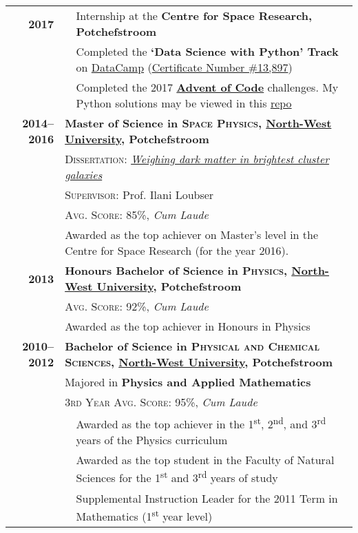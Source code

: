 \documentclass[a4paper,10pt]{article}
\begin{document}
\begin{tabularx}{\textwidth}{r l X}
	\textbf{2017} & \textbullet &
	Internship at the \textbf{Centre for Space Research, Potchefstroom} \\
	& \textbullet & Completed the \textbf{`Data Science with Python' Track} on \href{https://www.datacamp.com/}{DataCamp} (\href{https://www.datacamp.com/Certificate\#13,897}{Certificate Number \#13,897}) \\
	& \textbullet & Completed the 2017 \textbf{\href{https://adventofcode.com/}{Advent of Code}} challenges. My Python solutions may be viewed in this \href{https://github.com/HenriBranken/Advent_of_Code_2017_python_3}{repo} \\\hline
	
	\textbf{2014--2016} & \multicolumn{2}{X}{\textbf{Master of Science in \textsc{Space Physics}, \href{https://www.nwu.ac.za/}{North-West University}, Potchefstroom}}\\
	& \multicolumn{2}{X}{\textsc{Dissertation:} \href{https://repository.nwu.ac.za/handle/10394/25063}{\textit{Weighing dark matter in brightest cluster galaxies}}}\\
	& \multicolumn{2}{X}{\textsc{Supervisor:} Prof. Ilani Loubser} \\
	& \multicolumn{2}{X}{\textsc{Avg. Score:} 85\%, \textit{Cum Laude}} \\
	& \multicolumn{2}{X}{Awarded as the top achiever on Master’s level in the Centre for Space Research (for the year 2016).} \\\hline

	\textbf{2013} & \multicolumn{2}{X}{\textbf{Honours Bachelor of Science in \textsc{Physics}, \href{https://www.nwu.ac.za/}{North-West University}, Potchefstroom}}\\
	& \multicolumn{2}{X}{\textsc{Avg. Score:} 92\%, \textit{Cum Laude}}\\
	& \multicolumn{2}{X}{Awarded as the top achiever in Honours in Physics}\\\hline

	\textbf{2010--2012} & \multicolumn{2}{X}{\textbf{Bachelor of Science in \textsc{Physical and Chemical Sciences}, \href{https://www.nwu.ac.za/}{North-West University}, Potchefstroom}} \\
 	& \multicolumn{2}{X}{Majored in \textbf{Physics and Applied Mathematics}} \\
 	& \multicolumn{2}{X}{\textsc{3rd Year Avg. Score:} 95\%, \textit{Cum Laude}} \\
 	& \textbullet & Awarded as the top achiever in the 1\textsuperscript{st}, 2\textsuperscript{nd}, and 3\textsuperscript{rd} years of the Physics curriculum\\
	& \textbullet & Awarded as the top student in the Faculty of Natural Sciences for the 1\textsuperscript{st} and 3\textsuperscript{rd} years of study\\
	& \textbullet & Supplemental Instruction Leader for the 2011 Term in Mathematics (1\textsuperscript{st} year level)\\\hline


\end{tabularx}
\end{document}

